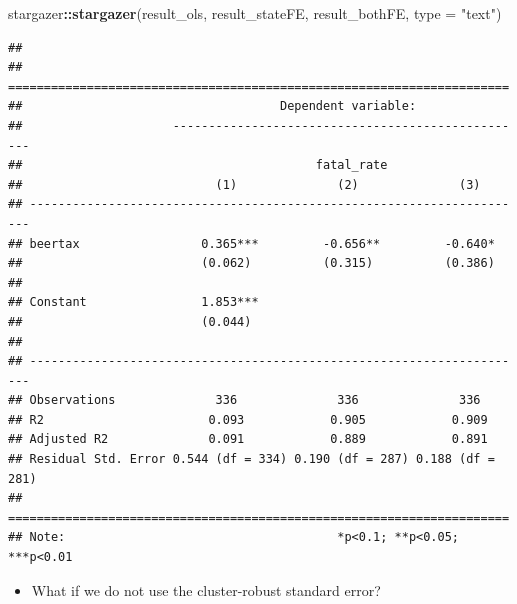 \documentclass[]{book}
\newenvironment{Shaded}{\begin{snugshade}}{\end{snugshade}}
\newcommand{\KeywordTok}[1]{\textcolor[rgb]{0.13,0.29,0.53}{\textbf{#1}}}
\newcommand{\DataTypeTok}[1]{\textcolor[rgb]{0.13,0.29,0.53}{#1}}
\newcommand{\StringTok}[1]{\textcolor[rgb]{0.31,0.60,0.02}{#1}}
\newcommand{\OperatorTok}[1]{\textcolor[rgb]{0.81,0.36,0.00}{\textbf{#1}}}
\newcommand{\NormalTok}[1]{#1}
\providecommand{\tightlist}{%
  \setlength{\itemsep}{0pt}\setlength{\parskip}{0pt}}
\begin{document}
\begin{Shaded}
\begin{Highlighting}[]
\NormalTok{stargazer}\OperatorTok{::}\KeywordTok{stargazer}\NormalTok{(result_ols, result_stateFE, result_bothFE, }\DataTypeTok{type =} \StringTok{"text"}\NormalTok{)}
\end{Highlighting}
\end{Shaded}

\begin{verbatim}
## 
## ======================================================================
##                                    Dependent variable:                
##                     --------------------------------------------------
##                                         fatal_rate                    
##                           (1)              (2)              (3)       
## ----------------------------------------------------------------------
## beertax                 0.365***         -0.656**         -0.640*     
##                         (0.062)          (0.315)          (0.386)     
##                                                                       
## Constant                1.853***                                      
##                         (0.044)                                       
##                                                                       
## ----------------------------------------------------------------------
## Observations              336              336              336       
## R2                       0.093            0.905            0.909      
## Adjusted R2              0.091            0.889            0.891      
## Residual Std. Error 0.544 (df = 334) 0.190 (df = 287) 0.188 (df = 281)
## ======================================================================
## Note:                                      *p<0.1; **p<0.05; ***p<0.01
\end{verbatim}

\begin{itemize}
\tightlist
\item
  What if we do not use the cluster-robust standard error?
\end{itemize}
\end{document}

